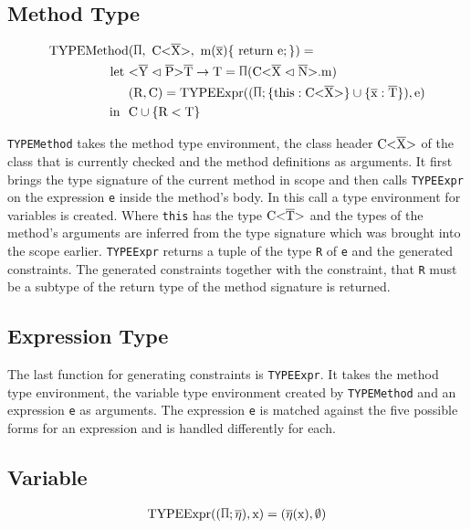 \subsection{Method Type}

\begin{align*}
    \text{TYPEMethod}&(\sprod{0.7}, \ \text{C<} \ot{X} \text{>}, \ \text{m} ( \ot{x} ) \{ \ \text{return e}; \} ) = \\
    \text{let} \ &\yp \oto{\text{T}} = \sprod{0.7} ( \cm ) \\
    & ( \text{R}, \text{C} ) = \text{TYPEExpr} (( \sprod{0.7}; \{ \text{this} : \text{C<} \ot{X} \text{>} \} \cup \{ \ot{x} : \ot{T} \} ) , \text{e} ) \\
    \text{in} \ \  & \text{C} \cup \{ \text{R} < \text{T} \}\\
\end{align*}

\verb|TYPEMethod| takes the method type environment, the class header $\text{C<}\overline{\text{X}}\text{>}$ of the class that is currently checked and the method definitions as arguments.
It first brings the type signature of the current method in scope and then calls \verb|TYPEExpr| on the expression \verb|e| inside the method's body. In this call a type environment for variables is created. Where \verb|this| has the type $\text{C<}\overline{\text{T}}\text{>}$ and the types of the method's arguments are inferred from the type signature which was brought into the scope earlier.
\verb|TYPEExpr| returns a tuple of the type \verb|R| of \verb|e| and the generated constraints. The generated constraints together with the constraint, that \verb|R| must be a subtype of the return type of the method signature is returned.

\subsection{Expression Type}
The last function for generating constraints is \verb|TYPEExpr|. It takes the method type environment, the variable type environment created by \verb|TYPEMethod| and an expression \verb|e| as arguments.
The expression \verb|e| is matched against the five possible forms for an expression and is handled differently for each.

\subsection{Variable}

\begin{align*}
    \texpr{\text{x}} = (\overline{\eta} (\text{x}), \emptyset)\\
\end{align*}

